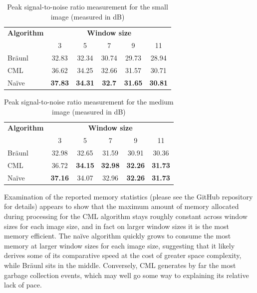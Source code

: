 \begin{table}
\centering
\caption{Peak signal-to-noise ratio measurement for the small image (measured in dB)}
\label{tab:median:psnrsmall}
\begin{tabular}{@{}lccccc@{}}
\toprule
\multicolumn{1}{c}{\textbf{Algorithm}} & \multicolumn{5}{c}{\textbf{Window size}}                                          \\
                                       & 3              & 5              & 7             & 9              & 11             \\ \midrule
Bräunl                                 & 32.83          & 32.34          & 30.74         & 29.73          & 28.94          \\
CML                                    & 36.62          & 34.25          & 32.66         & 31.57          & 30.71          \\
Naïve                                  & \textbf{37.83} & \textbf{34.31} & \textbf{32.7} & \textbf{31.65} & \textbf{30.81} \\ \bottomrule
\end{tabular}
\end{table}

\begin{table}
\centering
\caption{Peak signal-to-noise ratio measurement for the medium image (measured in dB)}
\begin{tabular}{@{}lccccc@{}}
\toprule
\multicolumn{1}{c}{\textbf{Algorithm}} & \multicolumn{5}{c}{\textbf{Window size}}                                           \\
                                       & 3              & 5              & 7              & 9              & 11             \\ \midrule
Bräunl                                 & 32.98          & 32.65          & 31.59          & 30.91          & 30.36          \\
CML                                    & 36.72          & \textbf{34.15} & \textbf{32.98} & \textbf{32.26} & \textbf{31.73} \\
Naïve                                  & \textbf{37.16} & 34.07          & 32.96          & \textbf{32.26} & \textbf{31.73} \\ \bottomrule
\end{tabular}
\label{tab:median:psnrmedium}
\end{table}

Examination of the reported memory statistics (please see the GitHub repository for details) appears to show that the maximum amount of memory allocated during processing for the CML algorithm stays roughly constant across window sizes for each image size, and in fact on larger window sizes it is the most memory efficient.  The naïve algorithm quickly grows to consume the most memory at larger window sizes for each image size, suggesting that it likely derives some of its comparative speed at the cost of greater space complexity, while Bräunl sits in the middle.  Conversely, CML generates by far the most garbage collection events, which may well go some way to explaining its relative lack of pace.

